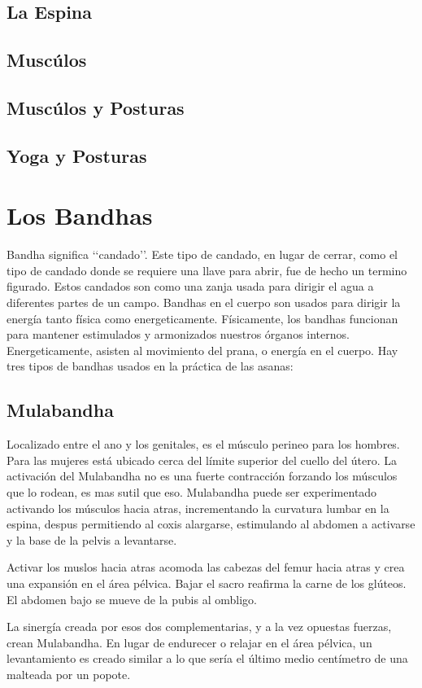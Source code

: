 \documentclass[11pt]{book}
\begin{document}
\subsection{La Espina}
\subsection{Muscúlos}
\subsection{Muscúlos y Posturas}
\subsection{Yoga y Posturas}
\newpage
\section{Los Bandhas}
Bandha significa \lq\lq candado\rq\rq. Este tipo de candado, en lugar de cerrar, como el tipo de candado donde se requiere una llave para abrir, fue de hecho un termino figurado. Estos candados son como una zanja usada para dirigir el agua a diferentes partes de un campo. Bandhas en el cuerpo son usados para dirigir la energía tanto física como energeticamente. Físicamente, los bandhas funcionan para mantener estimulados y armonizados nuestros órganos internos. Energeticamente, asisten al movimiento del prana, o energía en el cuerpo. Hay tres tipos de bandhas usados en la práctica de las asanas:

\subsection{Mulabandha}
Localizado entre el ano y los genitales, es el músculo perineo para los hombres. Para las mujeres está ubicado cerca del límite superior del cuello del útero. La activación del Mulabandha no es una fuerte contracción forzando los músculos que lo rodean, es mas sutil que eso. Mulabandha puede ser experimentado activando los músculos hacia atras, incrementando la curvatura lumbar en la espina, despus permitiendo al coxis alargarse, estimulando al abdomen a activarse y la base de la pelvis a levantarse.

Activar los muslos hacia atras acomoda las cabezas del femur hacia atras y crea una expansión en el área pélvica.
Bajar el sacro reafirma la carne de los glúteos. El abdomen bajo se mueve de la pubis al ombligo.

La sinergía creada por esos dos complementarias, y a la vez opuestas fuerzas, crean Mulabandha. En lugar de endurecer o relajar en el área pélvica, un levantamiento es creado similar a lo que sería el último medio centímetro de una malteada por un popote.
\end{document}
